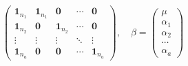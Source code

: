 \begin{definition}
\begin{gather*}
\begin{pmatrix}
			\mathbf{1}_{n_1} & \mathbf{1}_{n_1} & \mathbf{0} & \cdots & \mathbf{0} \\
			\mathbf{1}_{n_2} & \mathbf{0} & \mathbf{1}_{n_2} & \cdots & \mathbf{0} \\
			\vdots & \vdots & \vdots & \ddots & \vdots \\
			\mathbf{1}_{n_a} & \mathbf{0} & \mathbf{0} & \cdots & \mathbf{1}_{n_a}
		\end{pmatrix},\quad
		\beta=
		\begin{pmatrix}
			\mu \\
			\alpha_1 \\
			\alpha_2 \\
			\cdots \\
			\alpha_a
		\end{pmatrix}
	\end{gather*}
\end{definition}
